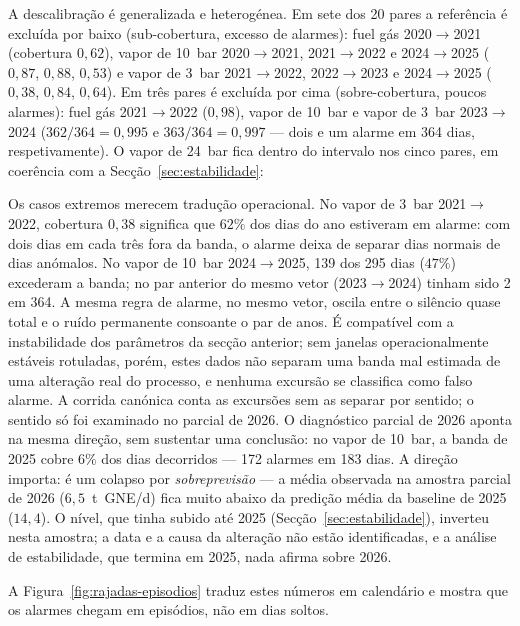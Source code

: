 A descalibração é generalizada e heterogénea. Em sete dos 20 pares a
referência é excluída por baixo (sub-cobertura, excesso de alarmes): fuel gás
2020${\to}$2021 (cobertura $0{,}62$), vapor de 10~bar 2020${\to}$2021,
2021${\to}$2022 e 2024${\to}$2025 ($0{,}87$, $0{,}88$, $0{,}53$) e vapor de
3~bar 2021${\to}$2022, 2022${\to}$2023 e 2024${\to}$2025 ($0{,}38$, $0{,}84$,
$0{,}64$). Em três pares é excluída por cima (sobre-cobertura, poucos
alarmes): fuel gás 2021${\to}$2022 ($0{,}98$), vapor de 10~bar e vapor de
3~bar 2023${\to}$2024 ($362/364 = 0{,}995$ e $363/364 = 0{,}997$ --- dois e
um alarme em 364 dias, respetivamente). O vapor de 24~bar fica dentro do intervalo nos cinco pares,
em coerência com a Secção~\ref{sec:estabilidade}: 

Os casos extremos merecem tradução operacional. No vapor de 3~bar
2021${\to}$2022, cobertura $0{,}38$ significa que $62\%$ dos dias do ano
estiveram em alarme: com dois dias em cada três fora da banda, o alarme
deixa de separar dias normais de dias anómalos. No vapor de 10~bar 2024${\to}$2025,
139 dos 295 dias ($47\%$) excederam a banda; no par anterior do mesmo vetor
(2023${\to}$2024) tinham sido 2 em 364. A mesma regra de alarme, no mesmo
vetor, oscila entre o silêncio quase total e o ruído permanente consoante o
par de anos. É compatível com a instabilidade dos parâmetros da secção
anterior; sem janelas operacionalmente estáveis rotuladas, porém, estes dados
não separam uma banda mal estimada de uma alteração real do processo, e
nenhuma excursão se classifica como falso alarme. A corrida canónica conta
as excursões sem as separar por sentido; o sentido só foi examinado no
parcial de 2026. O diagnóstico parcial de
2026 aponta na mesma direção, sem sustentar uma conclusão: no vapor de 10~bar,
a banda de 2025 cobre $6\%$ dos dias decorridos --- 172 alarmes em 183 dias.
A direção importa: é um colapso por \emph{sobreprevisão} --- a média
observada na amostra parcial de 2026 ($6{,}5$~t~GNE/d) fica muito abaixo da
predição média da baseline de 2025 ($14{,}4$). O nível, que tinha subido até
2025 (Secção~\ref{sec:estabilidade}), inverteu nesta amostra; a data e a
causa da alteração não estão identificadas, e a análise de estabilidade,
que termina em 2025, nada afirma sobre 2026.

A Figura~\ref{fig:rajadas-episodios} traduz estes números em calendário e
mostra que os alarmes chegam em episódios, não em dias soltos.

